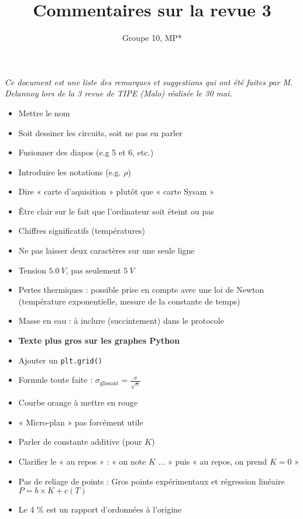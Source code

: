 \documentclass{article}
\title{Commentaires sur la revue 3}
\author{Groupe 10, MP*}
\begin{document}
\maketitle

\textit{Ce document est une liste des remarques et suggestions qui ont été faites par M. Delannoy lors de la 3 revue de TIPE (Malo) réalisée le 30 mai.}

\vspace{1cm}

\begin{itemize}
    \item Mettre le nom
    \item Soit dessiner les circuits, soit ne pas en parler
    \item Fusionner des diapos (e.g 5 et 6, etc.)
    \item Introduire les notations (e.g. $\rho$)
    \item Dire « carte d'aquisition » plutôt que « carte Sysam »
    \item Être clair sur le fait que l'ordinateur soit éteint ou pas
    \item Chiffres significatifs (températures)
    \item Ne pas laisser deux caractères sur une seule ligne
    \item Tension $\SI{5,0}{V}$, pas seulement $\SI{5}{V}$
    \item Pertes thermiques : possible prise en compte avec une loi de Newton (température exponentielle, mesure de la constante de temps)
    \item Masse en eau : à inclure (succintement) dans le protocole
    \item \textbf{Texte plus gros sur les graphes Python}
    \item Ajouter un \texttt{plt.grid()}
    \item Formule toute faite : $\sigma_\text{glissant} = \frac{\sigma}{\sqrt{n}}$
    \item Courbe orange à mettre en rouge
    \item « Micro-plan » pas forcément utile
    \item Parler de constante additive (pour $K$)
    \item Clarifier le « au repos » : « on note $K$ ... » puis « au repos, on prend $K = 0$ »
    \item Pas de reliage de points : Gros points expérimentaux et régression linéaire $P = b \times K + c(T)$
    \item Le 4 \% est un rapport d'ordonnées à l'origine

\end{itemize}
\end{document}
